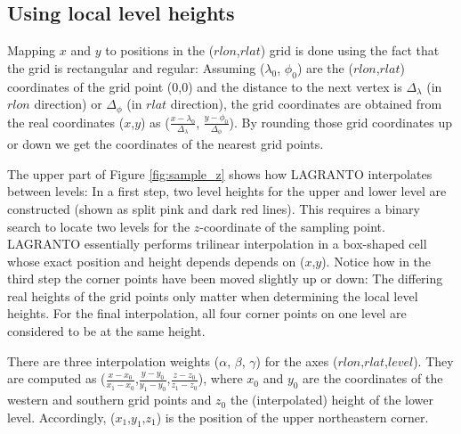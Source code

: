 \subsection{Using local level heights}
Mapping $x$ and $y$ to positions in the ($rlon$,$rlat$) grid is done using the fact that the grid is rectangular and regular: Assuming ($\lambda_0$, $\phi_0$) are the ($rlon$,$rlat$) coordinates of the grid point ($0$,$0$) and the distance to the next vertex is $\Delta_\lambda$ (in $rlon$ direction) or $\Delta_\phi$ (in $rlat$ direction), the grid coordinates are obtained from the real coordinates ($x$,$y$) as ($\frac{x - \lambda_0}{\Delta_\lambda}$, $\frac{y - \phi_0}{\Delta_\phi}$). By rounding those grid coordinates up or down we get the coordinates of the nearest grid points.

The upper part of Figure \ref{fig:sample_z} shows how LAGRANTO interpolates between levels: In a first step, two level heights for the upper and lower level are constructed (shown as split pink and dark red lines). This requires a binary search to locate two levels for the $z$-coordinate of the sampling point. LAGRANTO essentially performs trilinear interpolation in a box-shaped cell whose exact position and height depends depends on ($x$,$y$). Notice how in the third step the corner points have been moved slightly up or down: The differing real heights of the grid points only matter when determining the local level heights. For the final interpolation, all four corner points on one level are considered to be at the same height.

There are three interpolation weights ($\alpha$, $\beta$, $\gamma$) for the axes ($rlon$,$rlat$,$level$). They are computed as ($\frac{x-x_0}{x_1-x_0}$,$\frac{y-y_0}{y_1-y_0}$,$\frac{z-z_0}{z_1-z_0}$), where $x_0$ and $y_0$ are the coordinates of the western and southern grid points and $z_0$ the (interpolated) height of the lower level. Accordingly, ($x_1$,$y_1$,$z_1$) is the position of the upper northeastern corner.

